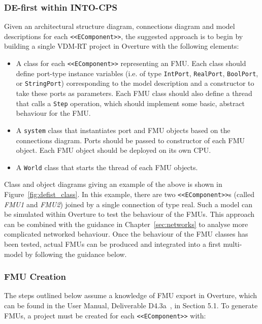 \subsubsection{DE-first within INTO-CPS}

Given an architectural structure diagram, connections diagram and model descriptions for each \texttt{<<EComponent>>}, the suggested approach is to begin by building a single VDM-RT project in Overture with the following elements:

\begin{itemize}[noitemsep]
\item A class for each \texttt{<<EComponent>>} representing an FMU. Each class should define port-type instance variables (i.e. of type \texttt{IntPort}, \texttt{RealPort}, \texttt{BoolPort}, or \texttt{StringPort}) corresponding to the model description and a constructor to take these ports as parameters. Each FMU class should also define a thread that calls a \texttt{Step} operation, which should implement some basic, abstract behaviour for the FMU.
\item A \texttt{system} class that instantiates port and FMU objects based on the connections diagram. Ports should be passed to constructor of each FMU object. Each FMU object should be deployed on its own CPU.
\item A \texttt{World} class that starts the thread of each FMU objects.
\end{itemize}

Class and object diagrams giving an example of the above is shown in Figure~\ref{fig:defist_class}. In this example, there are two \texttt{<<EComponent>>}s (called \emph{FMU1} and \emph{FMU2}) joined by a single connection of type real. Such a model can be simulated within Overture to test the behaviour of the FMUs. This approach can be combined with the guidance in Chapter~\ref{sec:networks} to analyse more complicated networked behaviour. Once the behaviour of the FMU classes has been tested, actual FMUs can be produced and integrated into a first multi-model by following the guidance below.

\subsubsection{FMU Creation}

The steps outlined below assume a knowledge of FMU export in Overture, which can be found in the User Manual, Deliverable D4.3a~\cite{INTOCPSD4.3a}, in Section 5.1. To generate FMUs, a project must be created for each \texttt{<<EComponent>>} with:

